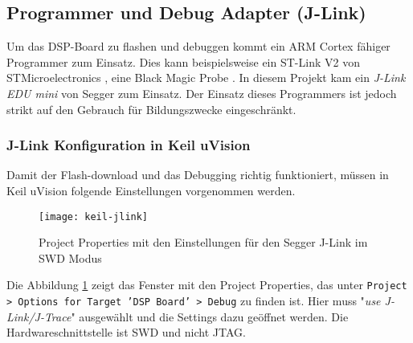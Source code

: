\subsection{Programmer und Debug Adapter (J-Link)}
\label{sec:SeggerJlink}

Um das DSP-Board zu flashen und debuggen kommt ein ARM Cortex fähiger Programmer zum Einsatz.
Dies kann beispielsweise ein ST-Link V2 von STMicroelectronics \cite{STLinkV2}, eine Black Magic Probe \cite{1bitBMP}.
In diesem Projekt kam ein \textit{J-Link EDU mini} von Segger\cite{JLinkEDU} zum Einsatz.
Der Einsatz dieses Programmers ist jedoch strikt auf den Gebrauch für Bildungszwecke eingeschränkt.

\subsubsection{J-Link Konfiguration in Keil uVision}

Damit der Flash-download und das Debugging richtig funktioniert, müssen in Keil uVision folgende Einstellungen vorgenommen werden.

\begin{figure}[H]
	\centering
	\texttt{[image: keil-jlink]}
	\caption{Project Properties mit den Einstellungen für den Segger J-Link im SWD Modus}
	\label{pic:keil-jlink}
\end{figure}

Die Abbildung \ref{pic:keil-jlink} zeigt das Fenster mit den Project Properties, das unter \texttt{Project > Options for Target 'DSP Board' > Debug} zu finden ist.
Hier muss "\textit{use J-Link/J-Trace}" ausgewählt und die Settings dazu geöffnet werden. 
Die Hardwareschnittstelle ist SWD und nicht JTAG.

